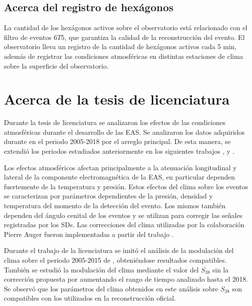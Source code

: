 \subsection{Acerca del registro de hexágonos}\label{hexagonos_rate}

La cantidad de los hexágonos activos sobre el observatorio está relacionado con el filtro de eventos $6T5$, que garantiza la calidad de la reconstrucción del evento. El observatorio lleva un registro de la cantidad de hexágonos activos cada 5 min, además de registrar las condiciones atmosféricas en distintas estaciones de clima sobre la superficie del observatorio. 


\section{Acerca de la tesis de licenciatura}

Durante la tesis de licenciatura se analizaron los efectos de las condiciones atmosféricas durante el desarrollo de las EAS.  Se analizaron los datos adquiridos durante en el periodo 2005-2018 por el arreglo principal. De esta manera, se extendió los periodos estudiados anteriormente en los siguientes trabajos \cite{abraham2009atmospheric}, \cite{abreu2012description}   y \cite{aab2017impact}. 

Los efectos atmosféricos afectan principalmente a la atenuación  longitudinal y lateral de la componente electromagnética  de la EAS, en particular dependen fuertemente de la temperatura y presión. Estos efectos del clima sobre los eventos se caracterizan por parámetros dependientes de la presión, densidad y temperatura del momento de la detección del evento. Los mismos también dependen del ángulo cenital de los eventos y se utilizan para corregir las señales registradas por los SDs. Las correcciones del clima utilizadas por la colaboración Pierre Auger fueron implementadas a partir del trabajo \cite{aab2017impact}. 

Durante el trabajo de la licenciatura se imitó el análisis de la modulación del clima sobre el periodo 2005-2015 de \cite{aab2017impact}, obteniéndose resultados compatibles. También se estudió la modulación del clima mediante el valor del $S_{38}$ sin la corrección propuesta por \cite{aab2017impact} aumentando el rango de tiempo analizado hasta el 2018. Se observó que los parámetros del clima obtenidos en este análisis sobre  $S_{38}$  son compatibles con los utilizados en la reconstrucción oficial. %


